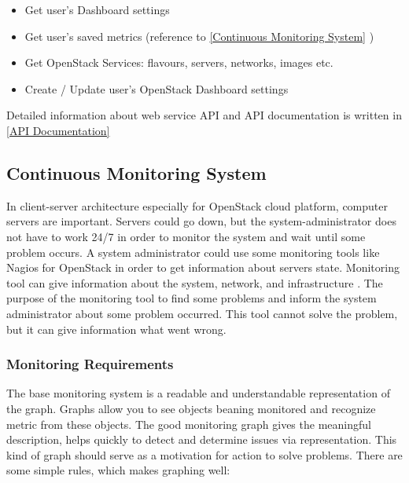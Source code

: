 \begin{itemize}
\item Get user's Dashboard settings
\item Get user's saved metrics (reference to \autoref{Continuous Monitoring System} )
\item Get OpenStack Services: flavours, servers, networks, images etc.
\item Create / Update user's OpenStack Dashboard settings
\end{itemize}

Detailed information about web service API and API documentation is written in \autoref{API Documentation}


\subsection{Continuous Monitoring System}\label{Continuous Monitoring System}

In client-server architecture especially for OpenStack cloud platform, computer servers are important. Servers could go down, but the system-administrator does not have to work 24/7 in order to monitor the system and wait until some problem occurs. A system administrator could use some monitoring tools like Nagios for OpenStack in order to get information about servers state. Monitoring tool can give information about the system, network, and infrastructure \cite{nagios}. The purpose of the monitoring tool to find some problems and inform the system administrator about some problem occurred. This tool cannot solve the problem, but it can give information what went wrong.
 
\subsubsection{Monitoring Requirements}\label{Monitoring requirements}

The base monitoring system is a readable and understandable representation of the graph. Graphs allow you to see objects beaning monitored and recognize metric from these objects. 
The good monitoring graph gives the meaningful description, helps quickly to detect and determine issues via representation. This kind of graph should serve as a motivation for action to solve problems. 
There are some simple rules, which makes graphing well:

